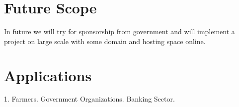 \documentclass[oneside,a4paper,12pt]{report}
\begin{document}
{\section{Future Scope}

In future we will try for sponsorship from government and will implement a project on large scale with some domain and hosting space online.

\section{Applications}

1.	Farmers.	Government Organizations.	Banking Sector.\newline





}
\end{document}
